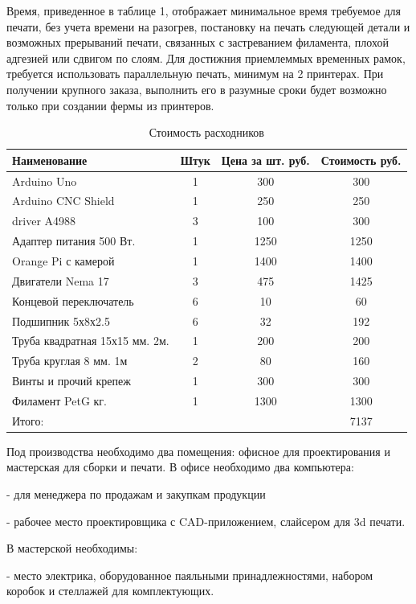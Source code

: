 Время, приведенное в таблице 1, отображает минимальное время требуемое для печати, без учета времени на разогрев, постановку на печать следующей детали и возможных прерываний печати, связанных с застреванием филамента, плохой адгезией или сдвигом по слоям. Для достижния приемлеммых временных рамок, требуется использовать параллельную печать, минимум на 2 принтерах. При получении крупного заказа, выполнить его в разумные сроки будет возможно только при создании фермы из принтеров. 

\begin{table}[h!]
    \centering
\begin{tabular}{|l|c|c|c| }
\hline
Наименование & Штук & Цена за шт. руб.  & Стоимость руб. \\
\hline
Arduino Uno & 1 & 300 & 300 \\
\hline
Arduino CNC Shield & 1  & 250 & 250 \\
\hline
driver A4988 & 3  & 100 & 300 \\
\hline
Адаптер питания 500 Вт. & 1 & 1250 & 1250 \\
\hline
Orange Pi  с камерой & 1 & 1400 & 1400\\
\hline
Двигатели Nema 17 & 3  & 475  & 1425  \\
\hline
Концевой переключатель & 6 & 10  & 60  \\
\hline
Подшипник 5х8х2.5 & 6  & 32  &  192 \\
\hline
Труба квадратная 15х15 мм. 2м. & 1  & 200  & 200  \\
\hline
Труба круглая 8 мм. 1м & 2 & 80 & 160 \\
\hline
Винты и прочий крепеж & 1 & 300 & 300 \\
\hline
Филамент PetG кг.  &  1  & 1300 & 1300 \\
\hline
Итого: &  &  & 7137 \\
\hline
\end{tabular}
\caption{Стоимость расходников}
\end{table}

Под производства необходимо два помещения: офисное для проектирования и мастерская для сборки и печати. В офисе необходимо два компьютера:

- для менеджера по продажам и закупкам продукции

- рабочее место проектировщика с CAD-приложением, слайсером для 3d печати.

В мастерской необходимы:

- место электрика, оборудованное паяльными принадлежностями, набором коробок и стеллажей для комплектующих.

